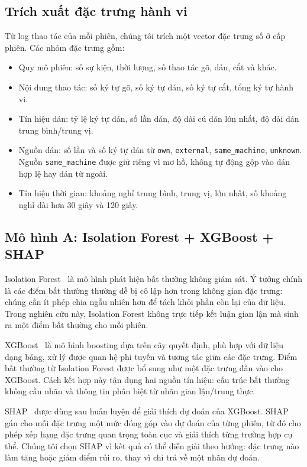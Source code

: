 \documentclass[runningheads]{llncs}
\begin{document}
\subsection{Trích xuất đặc trưng hành vi}
Từ log thao tác của mỗi phiên, chúng tôi trích một vector đặc trưng số ở cấp
phiên. Các nhóm đặc trưng gồm:
\begin{itemize}
\item Quy mô phiên: số sự kiện, thời lượng, số thao tác gõ, dán, cắt và khác.
\item Nội dung thao tác: số ký tự gõ, số ký tự dán, số ký tự cắt, tổng ký tự
hành vi.
\item Tín hiệu dán: tỷ lệ ký tự dán, số lần dán, độ dài cú dán lớn nhất, độ
dài dán trung bình/trung vị.
\item Nguồn dán: số lần và số ký tự dán từ \texttt{own}, \texttt{external},
\texttt{same\_machine}, \texttt{unknown}. Nguồn \texttt{same\_machine} được
giữ riêng vì mơ hồ, không tự động gộp vào dán hợp lệ hay dán từ ngoài.
\item Tín hiệu thời gian: khoảng nghỉ trung bình, trung vị, lớn nhất, số khoảng
nghỉ dài hơn 30 giây và 120 giây.
\end{itemize}

\subsection{Mô hình A: Isolation Forest + XGBoost + SHAP}
Isolation Forest~\cite{isoforest} là mô hình phát hiện bất thường không giám
sát. Ý tưởng chính là các điểm bất thường thường dễ bị cô lập hơn trong không
gian đặc trưng: chúng cần ít phép chia ngẫu nhiên hơn để tách khỏi phần còn lại
của dữ liệu. Trong nghiên cứu này, Isolation Forest không trực tiếp kết luận
gian lận mà sinh ra một điểm bất thường cho mỗi phiên.

XGBoost~\cite{xgboost} là mô hình boosting dựa trên cây quyết định, phù hợp với
dữ liệu dạng bảng, xử lý được quan hệ phi tuyến và tương tác giữa các đặc
trưng. Điểm bất thường từ Isolation Forest được bổ sung như một đặc trưng đầu
vào cho XGBoost. Cách kết hợp này tận dụng hai nguồn tín hiệu: cấu trúc bất
thường không cần nhãn và thông tin phân biệt từ nhãn gian lận/trung thực.

SHAP~\cite{shap} được dùng sau huấn luyện để giải thích dự đoán của XGBoost.
SHAP gán cho mỗi đặc trưng một mức đóng góp vào dự đoán của từng phiên, từ đó
cho phép xếp hạng đặc trưng quan trọng toàn cục và giải thích từng trường hợp
cụ thể. Chúng tôi chọn SHAP vì kết quả có thể diễn giải theo hướng: đặc trưng
nào làm tăng hoặc giảm điểm rủi ro, thay vì chỉ trả về một nhãn dự đoán.
\end{document}
